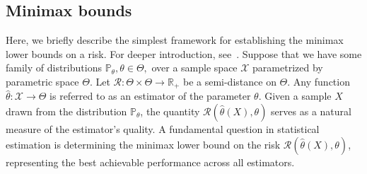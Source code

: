 \documentclass[11pt]{article}
\newcommand{\bbR}{\mathbb{R}}
\renewcommand{\P}{\mathbb{P}}
\newcommand{\cR}{\mathcal{R}}
\newcommand{\cX}{\mathcal{X}}
\newcommand{\<}{\langle}
\renewcommand{\>}{\rangle}
\theoremstyle{plain}
\theoremstyle{definition}
\theoremstyle{remark}
\begin{document}
{\subsection{Minimax bounds}
\label{sec:minimax bounds}

Here, we briefly describe the simplest framework for establishing the minimax lower bounds on a risk. For deeper introduction, see~\citep{tsybakov_introduction_2009}. Suppose that we have some family of distributions $\P_{\theta}, \theta \in \Theta,$ over a sample space $\cX$ parametrized by parametric space $\Theta$. Let $\cR : \Theta \times \Theta \to \bbR_+$ be a semi-distance on $\Theta$. Any function \(\widehat{\theta}: \cX \to \Theta\) is referred to as an estimator of the parameter \(\theta\). Given a sample \(X\) drawn from the distribution \(\P_\theta\), the quantity \(\cR(\widehat{\theta}(X), \theta)\) serves as a natural measure of the estimator’s quality. A fundamental question in statistical estimation is determining the minimax lower bound on the risk \(\cR(\widehat{\theta}(X), \theta)\), representing the best achievable performance across all estimators.

}
\end{document}

